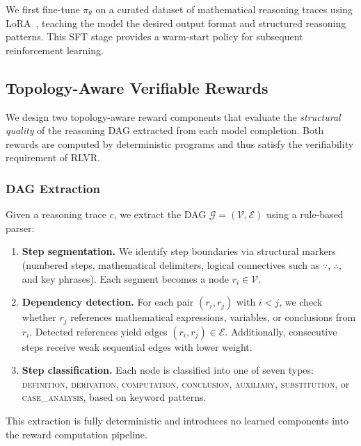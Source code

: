 We first fine-tune $\pi_\theta$ on a curated dataset of mathematical
reasoning traces using LoRA~\citep{hu2022lora}, teaching the model the
desired output format and structured reasoning patterns. This SFT stage
provides a warm-start policy for subsequent reinforcement learning.

\subsection{Topology-Aware Verifiable Rewards}
\label{sec:topo_rewards}

We design two topology-aware reward components that evaluate the
\emph{structural quality} of the reasoning DAG extracted from each model
completion. Both rewards are computed by deterministic programs and thus
satisfy the verifiability requirement of RLVR.

\subsubsection{DAG Extraction}
\label{sec:dag_extraction}

Given a reasoning trace $c$, we extract the DAG $\mathcal{G} =
(\mathcal{V}, \mathcal{E})$ using a rule-based parser:
\begin{enumerate}[leftmargin=*,itemsep=1pt]
    \item \textbf{Step segmentation.} We identify step boundaries via
    structural markers (numbered steps, mathematical delimiters, logical
    connectives such as $\because$, $\therefore$, and key phrases).
    Each segment becomes a node $r_i \in \mathcal{V}$.
    \item \textbf{Dependency detection.} For each pair $(r_i, r_j)$ with
    $i < j$, we check whether $r_j$ references mathematical expressions,
    variables, or conclusions from $r_i$. Detected references yield edges
    $(r_i, r_j) \in \mathcal{E}$. Additionally, consecutive steps receive
    weak sequential edges with lower weight.
    \item \textbf{Step classification.} Each node is classified into one of
    seven types: \textsc{definition}, \textsc{derivation},
    \textsc{computation}, \textsc{conclusion}, \textsc{auxiliary},
    \textsc{substitution}, or \textsc{case\_analysis}, based on keyword
    patterns.
\end{enumerate}
This extraction is fully deterministic and introduces no learned components
into the reward computation pipeline.

